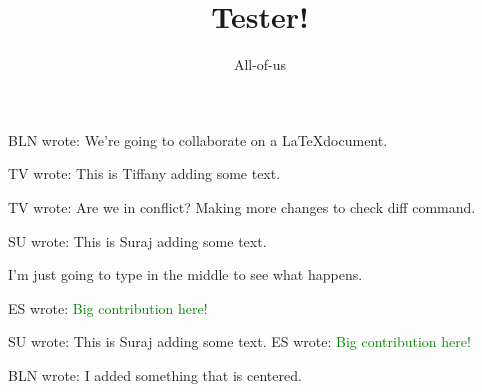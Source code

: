 \documentclass[12pt]{article}
\title{Tester!}
\author{All-of-us}
\newcommand{\bln}[1]{BLN wrote: \textcolor{red!70!blue!70}{#1}}
\newcommand{\tv}[1]{TV wrote: \textcolor{blue!70}{#1}}
\newcommand{\su}[1]{SU wrote: \textcolor{green!70}{#1}}
\newcommand{\su}[1]{SU wrote: \textcolor{green!70}{#1}}
\newcommand{\es}[1]{ES wrote: \textcolor{green}{#1}}
\begin{document}
\maketitle

\bln{We're going to collaborate on a \LaTeX document.}

\tv{This is Tiffany adding some text.}

\tv{Are we in conflict? Making more changes to check diff command.}


\su{This is Suraj adding some text.}

I'm just going to type in the middle to see what happens.

\es{Big contribution here!}

\su{This is Suraj adding some text.}
\es{Big contribution here!}


\begin{center}
  \bln{I added something that is centered.}
\end{center}
\end{document}
